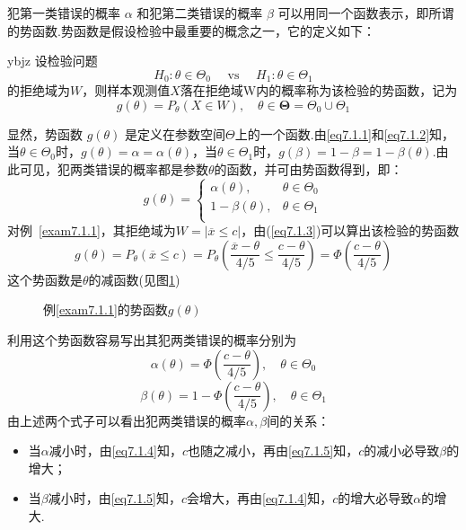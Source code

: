 犯第一类错误的概率 $\alpha$ 和犯第二类错误的概率 $\beta$ 可以用同一个函数表示，即所谓的势函数.势函数是假设检验中最重要的概念之一，它的定义如下：
\begin{definition}{}{ybjz}
	设检验问题
	\[H _ { 0 } : \theta \in \Theta _ { 0 } \quad \text { vs } \quad H _ { 1 } : \theta \in \Theta  _ { 1 }\]
	的拒绝域为$W$，则样本观测值$X$落在拒绝域W内的概率称为该检验的势函数，记为
	\begin{equation}\label{eq7.1.3}
	g\left(\theta\right)=P_{\theta}\left(X\in  W\right),\quad\theta\in\boldsymbol{\Theta }=\Theta_0\cup\Theta_1
	\end{equation}
\end{definition}
显然，势函数 $g(\theta)$ 是定义在参数空间$\Theta$上的一个函数.由\ref{eq7.1.1}和\ref{eq7.1.2}知，当$\theta \in \Theta_{ 0 }$时，$g ( \theta ) = \alpha = \alpha ( \theta )$，当$\theta \in \Theta_{1 }$时，$g ( \beta ) = 1-\beta = 1-\beta ( \theta )$.由此可见，犯两类错误的概率都是参数$\theta$的函数，并可由势函数得到，即：
\[
g\left(\theta\right)=\left\{\begin{matrix}
\alpha\left(\theta\right),&		\theta\in\Theta_0\\
1-\beta\left(\theta\right),&		\theta\in\Theta_1\\
\end{matrix}\right. 
\]
对例~\ref{exam7.1.1}，其拒绝域为$W = | \overline{ x } \leq c |$，由(\ref{eq7.1.3})可以算出该检验的势函数
\[
g\left(\theta\right)=P_{\theta}\left(\overline{x}\leq c\right)=P_{\theta}\left(\frac{\overline{x}-\theta}{4/5}\le\frac{c-\theta}{4/5}\right)=\Phi\left(\frac{c-\theta}{4/5}\right)
\]
这个势函数是$\theta$的减函数(见图\ref{fig7.1.2})
\begin{figure}[htbp]
	\centering
	\caption{例\ref{exam7.1.1}的势函数$g(\theta)$}\label{fig7.1.2}
\end{figure}

利用这个势函数容易写出其犯两类错误的概率分别为
\begin{equation}\label{eq7.1.4}
\alpha\left(\theta\right)=\Phi\left(\frac{c-\theta}{4/5}\right),\quad\theta\in\Theta_0
\end{equation}
\begin{equation}\label{eq7.1.5}
\beta\left(\theta\right)=1-\Phi\left(\frac{c-\theta}{4/5}\right),\quad\theta\in\Theta_1
\end{equation}
由上述两个式子可以看出犯两类错误的概率$\alpha,\beta$间的关系：
\begin{itemize}
	\item 当$\alpha$减小时，由\ref{eq7.1.4}知，$c$也随之减小，再由\ref{eq7.1.5}知，$c$的减小必导致$\beta$的增大；
	\item 当$\beta$减小时，由\ref{eq7.1.5}知，$c$会增大，再由\ref{eq7.1.4}知，$c$的增大必导致$\alpha$的增大.
	
\end{itemize}

